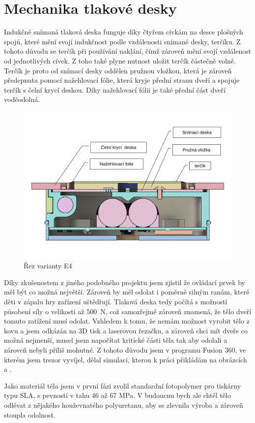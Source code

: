 \section{Mechanika tlakové desky}
\label{E4-mech_tlakovky}

Indukčně snímaná tlaková deska funguje díky čtyřem cívkám na desce plošných spojů, které mění svojí indukčnost podle vzdálenosti snímané desky, terčíku.
Z tohoto důvodu se terčík při používání naklání, čímž zároveň mění svojí vzdálenost od jednotlivých cívek. Z toho také plyne nutnost uložit terčík
částečně volně. Terčík je proto od snímací desky oddělen pružnou vložkou, která je zároveň předepnuta pomocí nažehlovací fólie, která kryje přední 
stranu dveří a spojuje terčík s čelní krycí deskou. Díky nažehlovací fólii je také přední část dveří voděodolná.

\begin{figure}[htbp]
    \centering
    \includegraphics[width=\textwidth]{kapitoly/obrazky/E4/machanika_tlakove_desky/rez_po_ose.pdf}
    \caption{Řez varianty E4}
    \label{fig:E4-rez}
\end{figure}

Díky zkušenostem z jiného podobného projektu jsem zjistil že ovládací prvek by měl být co možná největší. 
Zároveň by měl odolat i poměrně silným ranám, které děti v zápalu hry zařízení uštědřují.
Tlaková deska tedy počítá s možností působení síly o velikosti až 500~N, což samozřejmě zároveň znamená, že tělo dveří tomuto zatížení musí odolat.
Vzhledem k tomu, že nemám možnost vyrobit tělo z kovu a jsem odkázán na 3D tisk a laserovou řezačku, a zároveň chci mít dveře co možná nejmenší,
musel jsem napočítat kritické části těla tak aby odolali a zároveň nebyli příliš mohutné. Z tohoto důvodu jsem v programu Fusion 360, ve kterém jsem trezor vyvíjel,
dělal simulaci, kterou k práci přikládám na obrázcích  a .

Jako materiál těla jsem v první fázi zvolil standardní fotopolymer pro tiskárny typu SLA, s pevností v tahu 46 až 67 MPa.
V budoucnu bych ale chtěl tělo odlévat z nějakého houževnatého polyuretanu, aby se zlevnila výroba a zároveň stoupla odolnost.

\newpage